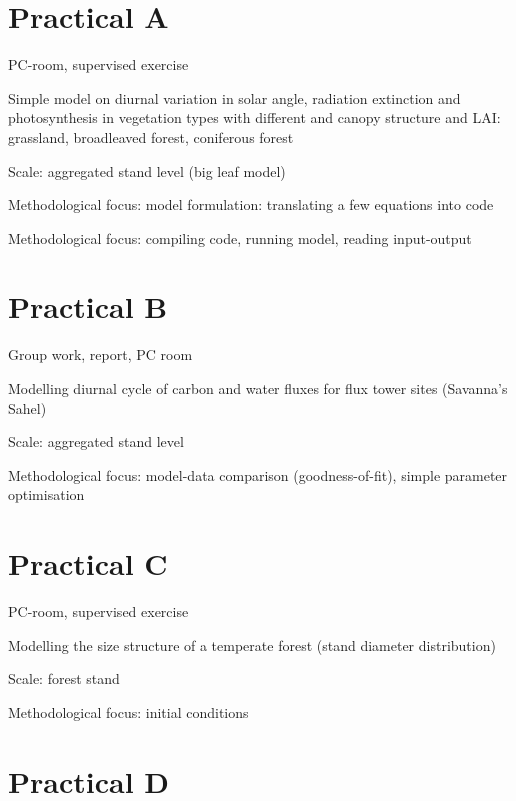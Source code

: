 \documentclass[
  oneside]{book}
\begin{document}
\hypertarget{practical-a}{%
\chapter*{Practical A}\label{practical-a}}

PC-room, supervised exercise

Simple model on diurnal variation in solar angle, radiation extinction and photosynthesis in vegetation types with different and canopy structure and LAI: grassland, broadleaved forest, coniferous forest

Scale: aggregated stand level (big leaf model)

Methodological focus: model formulation: translating a few equations into code

Methodological focus: compiling code, running model, reading input-output

\hypertarget{practical-b}{%
\chapter*{Practical B}\label{practical-b}}

Group work, report, PC room

Modelling diurnal cycle of carbon and water fluxes for flux tower sites (Savanna's Sahel)

Scale: aggregated stand level

Methodological focus: model-data comparison (goodness-of-fit), simple parameter optimisation

\hypertarget{practical-c}{%
\chapter*{Practical C}\label{practical-c}}

PC-room, supervised exercise

Modelling the size structure of a temperate forest (stand diameter distribution)

Scale: forest stand

Methodological focus: initial conditions

\hypertarget{practical-d}{%
\chapter*{Practical D}\label{practical-d}}
\end{document}
